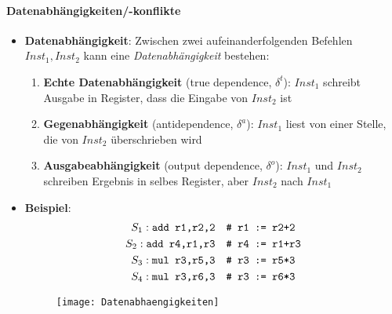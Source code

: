 \paragraph{Datenabhängigkeiten/-konflikte}
\begin{itemize}
  \item \textbf{Datenabhängigkeit}: Zwischen zwei aufeinanderfolgenden Befehlen \( Inst_1, Inst_2 \) kann eine \emph{Datenabhängigkeit} bestehen:
  \begin{enumerate}
    \item \textbf{Echte Datenabhängigkeit} (true dependence, \( \delta^t \)): \( Inst_1 \) schreibt Ausgabe in Register, dass die Eingabe von \( Inst_2 \) ist
    \item \textbf{Gegenabhängigkeit} (antidependence, \( \delta^a \)): \( Inst_1 \) liest von einer Stelle, die von \( Inst_2 \) überschrieben wird
    \item \textbf{Ausgabeabhängigkeit} (output dependence, \( \delta^o \)): \( Inst_1 \) und \( Inst_2 \) schreiben Ergebnis in selbes Register, aber \( Inst_2 \) nach \( Inst_1 \)
  \end{enumerate}

  \item \textbf{Beispiel}:
  \begin{align*}
    S_1: \text{\code{add r1,r2,2}} &\quad \text{\code{# r1 := r2+2}} \\
    S_2: \text{\code{add r4,r1,r3}} &\quad \text{\code{# r4 := r1+r3}} \\
    S_3: \text{\code{mul r3,r5,3}} &\quad \text{\code{# r3 := r5*3}} \\
    S_4: \text{\code{mul r3,r6,3}} &\quad \text{\code{# r3 := r6*3}}
  \end{align*}
  \begin{figure}[H]\centering\label{Datenabhaengigkeiten}\texttt{[image: Datenabhaengigkeiten]}\end{figure}


\end{itemize}
